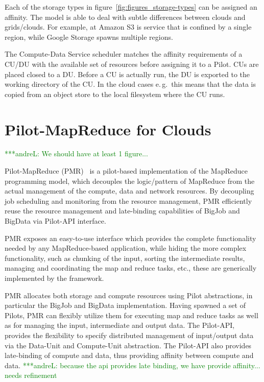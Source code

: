 \documentclass[times]{cpeauth}
\newcommand{\alnote}[1]{ {\textcolor{green} { ***andreL: #1 }}}
\newcommand{\alnote}[1]{}
\newcommand{\pilot}{Pilot\xspace}
\newcommand{\pilots}{Pilots\xspace}
\newcommand{\computedataservice}{Compute-Data Service\xspace}
\newcommand{\computeunit}{Compute-Unit\xspace}
\newcommand{\dataunit}{Data-Unit\xspace}
\newcommand{\du}{DU\xspace}
\newcommand{\cu}{CU\xspace}
\newcommand{\cus}{CUs\xspace}
\begin{document}
Each of the storage types in figure~\ref{fig:figures_storage-types} can be 
assigned an affinity. The model is able to deal with subtle differences 
between clouds and grids/clouds. For example, at Amazon S3 is service that is 
confined by a single region, while Google Storage spawns multiple regions.

The \computedataservice scheduler matches the affinity requirements of
a \cu/\du with the available set of resources before assigning it to a
\pilot.  \cus are placed closed to a \du. Before a \cu is actually
run, the \du is exported to the working directory of the \cu. In the
cloud cases e.\,g.\ this means that the data is copied from an object
store to the local filesystem where the \cu runs.


\section{Pilot-MapReduce for Clouds}

\alnote{We should have at least 1 figure...}

Pilot-MapReduce (PMR)~\cite{Mantha:2012:PEF:2287016.2287020} is a pilot-based
implementation of the MapReduce programming model, which decouples the
logic/pattern of MapReduce from the actual management of the compute, data and
network resources. By decoupling job scheduling and monitoring from the
resource management, PMR efficiently reuse the resource management and
late-binding capabilities of BigJob and BigData via Pilot-API interface.

PMR exposes an easy-to-use interface which provides the complete
functionality needed by any MapReduce-based application, while hiding
the more complex functionality, such as chunking of the input, sorting
the intermediate results, managing and coordinating the map and reduce
tasks, etc., these are generically implemented by the
framework.

PMR allocates both storage and compute resources using \pilot abstractions, in
particular the BigJob and BigData implementation. Having spawned a set of
\pilots, PMR can flexibly utilize them for executing map and reduce tasks as
well as for managing the input, intermediate and output data. The Pilot-API,
provides the flexibility to specify distributed management of input/output
data via the \dataunit and \computeunit abstraction. The Pilot-API also
provides late-binding of compute and data, thus providing affinity between
compute and data. \alnote{because the api provides late binding, we have provide affinity... needs refinement}
\end{document}
